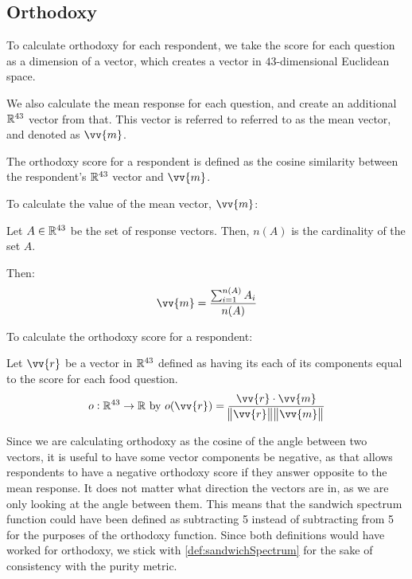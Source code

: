 \subsection{Orthodoxy}\label{subsec:orthodoxyMetric}
To calculate orthodoxy for each respondent, we take the score for each question as a dimension of a vector, which creates a vector in $43$-dimensional Euclidean space.

We also calculate the mean response for each question, and create an additional $\mathbb{R}^{43}$ vector from that.
This vector is referred to referred to as the mean vector, and denoted as $\vv{m}$.

The orthodoxy score for a respondent is defined as the cosine similarity between the respondent's $\mathbb{R}^{43}$ vector and $\vv{m}$.

\begin{definition}
	To calculate the value of the mean vector, $\vv{m}$:

	Let $A \in \mathbb{R}^{43}$ be the set of response vectors.
	Then, $n(A)$ is the cardinality of the set $A$.

	Then:
	\begin{equation}
		\vv{m} = \frac{\sum_{i = 1}^{n(A)} A_i}{n(A)}
	\end{equation}
\end{definition}

\begin{definition}
	To calculate the orthodoxy score for a respondent:

	Let $\vv{r}$ be a vector in $\mathbb{R}^{43}$ defined as having its each of its components equal to the score for each food question.
	\begin{equation}
		o \from \real^{43} \to \real\ \text{by}\ o(\vv{r}) = \frac{\vv{r} \cdot \vv{m}}{\norm{\vv{r}} \norm{\vv{m}}}
	\end{equation}
\end{definition}

Since we are calculating orthodoxy as the cosine of the angle between two vectors, it is useful to have some vector components be negative, as that allows respondents to have a negative orthodoxy score if they answer opposite to the mean response.
It does not matter what direction the vectors are in, as we are only looking at the angle between them.
This means that the sandwich spectrum function could have been defined as subtracting 5 instead of subtracting from 5 for the purposes of the orthodoxy function.
Since both definitions would have worked for orthodoxy, we stick with \cref{def:sandwichSpectrum} for the sake of consistency with the purity metric.

